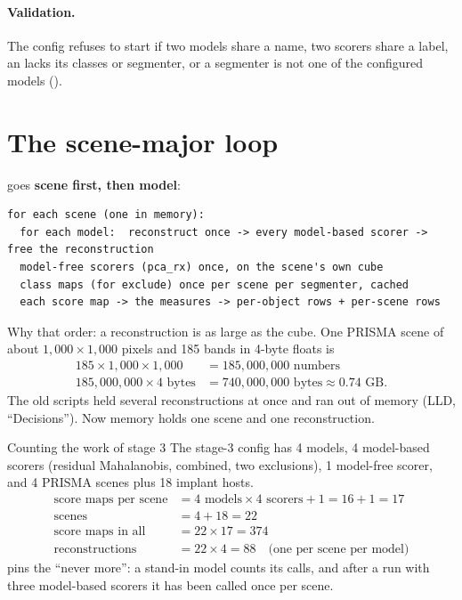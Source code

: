 \paragraph{Validation.} The config refuses to start if two models share a name, two scorers share a label, an
 lacks its classes or segmenter, or a segmenter is not one of the configured models
().

\section{The scene-major loop}\label{sec:runeval:loop}

 goes \textbf{scene first, then model}:
\begin{lstlisting}[basicstyle=\ttfamily\footnotesize,language={}]
for each scene (one in memory):
  for each model:  reconstruct once -> every model-based scorer -> free the reconstruction
  model-free scorers (pca_rx) once, on the scene's own cube
  class maps (for exclude) once per scene per segmenter, cached
  each score map -> the measures -> per-object rows + per-scene rows
\end{lstlisting}

Why that order: a reconstruction is as large as the cube. One PRISMA scene of about $1{,}000 \times 1{,}000$ pixels
and 185 bands\tagA{} in 4-byte floats is
\begin{align*}
185 \times 1{,}000 \times 1{,}000 &= 185{,}000{,}000 \text{ numbers}\\
185{,}000{,}000 \times 4 \text{ bytes} &= 740{,}000{,}000 \text{ bytes} \approx 0.74 \text{ GB.}
\end{align*}
The old scripts held several reconstructions at once and ran out of memory (LLD, ``Decisions''). Now memory holds one
scene and one reconstruction.

\begin{worked}[label={we:runeval:count}]{Counting the work of stage 3}
The stage-3 config has 4 models, 4 model-based scorers (residual Mahalanobis, combined, two exclusions), 1
model-free scorer, and 4 PRISMA scenes plus 18 implant hosts.
\begin{align*}
\text{score maps per scene} &= 4 \text{ models} \times 4 \text{ scorers} + 1 = 16 + 1 = 17\\
\text{scenes} &= 4 + 18 = 22\\
\text{score maps in all} &= 22 \times 17 = 374\\
\text{reconstructions} &= 22 \times 4 = 88 \quad \text{(one per scene per model)}
\end{align*}
 pins the ``never more'': a stand-in model counts its calls, and after a run with
three model-based scorers it has been called once per scene.
\end{worked}

